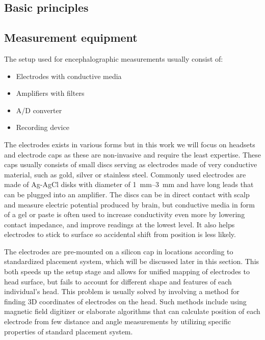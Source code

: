 \subsection{Basic principles}

\subsection{Measurement equipment}
The setup used for encephalographic measurements usually consist of: 
\begin{itemize}
  \item Electrodes with conductive media
  \item Amplifiers with filters
  \item A/D converter
  \item Recording device
\end{itemize}
The electrodes exists in various forms but in this work we will focus on
headsets and electrode caps as these are non-invasive and require the least
expertise. These caps usually consists of small discs serving as electrodes made
of very conductive material, such as gold, silver or stainless steel. Commonly
used electrodes are made of Ag-AgCl disks with diameter of \SIrange[range-units
= single]{1}{3}{\mm} and have long leads that can be plugged into an
amplifier. \cite{eegFund} The discs can be in direct contact with scalp and
measure electric potential produced by brain, but conductive media in form of a
gel or paste is often used to increase conductivity even more by lowering
contact impedance, and improve readings at the lowest level. It also helps
electrodes to stick to surface so accidental shift from position is less likely.

The electrodes are pre-mounted on a silicon cap in locations according to
standardized placement system, which will be discussed later in this section.
This both speeds up the setup stage and allows for unified mapping of electrodes
to head surface, but fails to account for different shape and features of each
individual's head. \cite{eegFund} This problem is usually solved by involving a
method for finding 3D coordinates of electrodes on the head. Such methods
include using magnetic field digitizer or elaborate algorithms that can
calculate position of each electrode from few distance and angle measurements by
utilizing specific properties of standard placement system. \cite{rapidPos}

